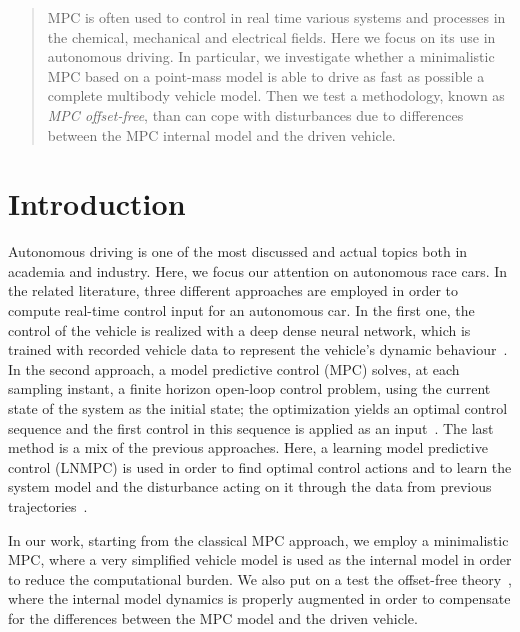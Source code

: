 \documentclass[conference]{IEEEtran} %
\begin{document}

\begin{abstract}
	MPC is often used to control in real time various systems and processes in the
	chemical, mechanical and electrical fields. Here we focus on its use in autonomous
	driving. In particular, we investigate whether a minimalistic MPC based on a
	point-mass model is able to drive as fast as possible a complete multibody vehicle model.
	Then we test a methodology, known as \emph{MPC offset-free}, than can cope with disturbances due to differences between the MPC internal model and the driven vehicle.
\end{abstract}

\IEEEpeerreviewmaketitle

\section{Introduction}
Autonomous driving is one of the most discussed and actual topics both in academia and industry. Here, we focus our attention on autonomous race cars. In the related literature, three different approaches are employed in order to compute real-time control input for an autonomous car.
In the first one, the control of the vehicle is realized with a deep dense neural network, which is trained with recorded vehicle data to represent the vehicle's dynamic behaviour~\cite{Hermansdorfer2020, Zhu2018, Navarro2018}. In the second approach, a model predictive control (MPC) solves, at each sampling instant, a finite horizon open-loop control problem, using the current state of the system as the initial state; the optimization yields an optimal control sequence and the first control in this sequence is applied as an input~\cite{Liniger2015, Novi2019, Verschueren2014}. The last method is a mix of the previous approaches. Here, a learning model predictive control (LNMPC) is used in order to find optimal control actions and
to learn the system model and the disturbance acting on it through the data from previous trajectories~\cite{Rosolia2016, Brunner2017, Limon2017}.

In our work, starting from the classical MPC approach, we employ a minimalistic MPC, where a very simplified vehicle model is used as the internal model in order to reduce the computational burden.
We also put on a test the offset-free theory~\cite{Pannocchia2015}, where the internal model dynamics is properly augmented in order to compensate for the differences between the MPC model and the driven vehicle.
\end{document}
